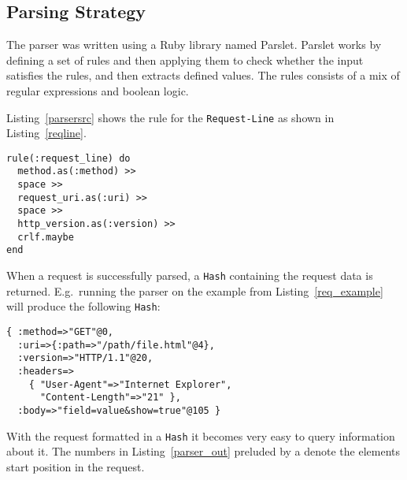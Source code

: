 \subsection{Parsing Strategy}
The parser was written using a Ruby library named Parslet. Parslet works by
defining a set of rules and then applying them to check whether the input
satisfies the rules, and then extracts defined values. The rules consists of a
mix of regular expressions and boolean logic.

Listing~\ref{parsersrc} shows the rule for the \texttt{Request-Line} as shown
in Listing~\ref{reqline}.

\bigskip
\begin{lstlisting}[label=parsersrc,caption=Request-Line parser rule.
(lib/yarn/parser.rb:61)]
rule(:request_line) do 
  method.as(:method) >> 
  space >> 
  request_uri.as(:uri) >> 
  space >> 
  http_version.as(:version) >> 
  crlf.maybe 
end
\end{lstlisting}

When a request is successfully parsed, a \texttt{Hash} containing the request
data is returned. E.g.\ running the parser on the example from
Listing~\ref{req_example} will produce the following \texttt{Hash}:

\bigskip
\begin{lstlisting}[label=parser_out,caption=Example \texttt{Parser} output]
{ :method=>"GET"@0,
  :uri=>{:path=>"/path/file.html"@4},
  :version=>"HTTP/1.1"@20,
  :headers=>
    { "User-Agent"=>"Internet Explorer",
      "Content-Length"=>"21" },
  :body=>"field=value&show=true"@105 }
\end{lstlisting}

With the request formatted in a \texttt{Hash} it becomes very easy to
query information about it. The numbers in Listing~\ref{parser_out} preluded
by a \@ denote the elements start position in the request.
